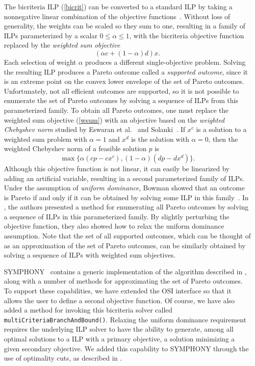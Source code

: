 The bicriteria ILP (\ref{bicrit}) can be converted to a standard ILP by
taking a nonnegative linear combination of the objective
functions~\cite{geoff68}. Without loss of generality, the weights can be
scaled so they sum to one, resulting in a family of ILPs parameterized by a
scalar $0 \leq \alpha \leq 1$, with the bicriteria objective function replaced
by the \emph{weighted sum objective}
\begin{equation}\label{wsum}
(\alpha c + (1 - \alpha) d) x.
\end{equation}
Each selection of weight $\alpha$ produces a different single-objective
problem. Solving the resulting ILP produces a Pareto outcome called a
\emph{supported outcome}, since it is an extreme point on the convex lower
envelope of the set of Pareto outcomes. Unfortunately, not all efficient
outcomes are supported, so it is not possible to enumerate the set of Pareto
outcomes by solving a sequence of ILPs from this parameterized family. To
obtain all Pareto outcomes, one must replace the weighted sum objective
(\ref{wsum}) with an objective based on the \emph{weighted Chebyshev norm}
studied by Eswaran et al.~\cite{eswaran89} and Solanki~\cite{solanki91}. If
$x^c$ is a solution to a weighted sum problem with $\alpha = 1$ and $x^d$ is
the solution with $\alpha = 0$, then the weighted Chebyshev norm of a feasible
solution $p$ is
\begin{equation}
\max \{\alpha (cp - cx^c), (1 - \alpha)(dp - dx^d)\}.
\label{chebyshev}
\end{equation} 
Although this objective function is not linear, it can easily be linearized by
adding an artificial variable, resulting in a second parameterized family of
ILPs. Under the assumption of \emph{uniform dominance}, Bowman showed that an
outcome is Pareto if and only if it can be obtained by solving some ILP in
this family~\cite{bowman76}. In \cite{WCN}, the authors presented a method for
enumerating all Pareto outcomes by solving a sequence of ILPs in this
parameterized family. By slightly perturbing the objective function, they also
showed how to relax the uniform dominance assumption. Note that the set of all
supported outcomes, which can be thought of as an approximation of the set of
Pareto outcomes, can be similarly obtained by solving a sequence of ILPs with
weighted sum objectives.

SYMPHONY \VER\  contains a generic implementation of the algorithm described in
\cite{WCN}, along with a number of methods for approximating the set of Pareto
outcomes. To support these capabilities, we have extended the OSI interface so
that it allows the user to define a second objective function. Of course, we
have also added a method for invoking this bicriteria solver called
\texttt{multiCriteriaBranchAndBound()}. Relaxing the uniform dominance
requirement requires the underlying ILP solver to have the ability to
generate, among all optimal solutions to a ILP with a primary objective, a
solution minimizing a given secondary objective. We added this capability to
SYMPHONY through the use of optimality cuts, as described in \cite{WCN}.

